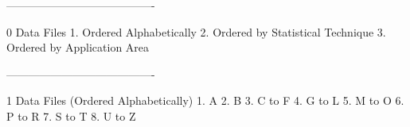  
 
 
 
 
 
 
 
 
 
 
 
 
 
 
 
 
 
 
 
 
 
 
 
 
 
 
 
 
 
 
 
 
 
 
 
 
 
 
 
 
 
 
 
 
 
 
 
 
 
 
 
 
 
 
 
 
 
 
 
 
 
 
 
 
 
 
 
 
 
 
 
 
 
 
 
 
 
 
 
 
 
 
 
 
 
 
 
 
 
 
 
 
 
 
 
 
 
 
 
 
 
----------------------------------------
 
0
Data Files
   1. Ordered Alphabetically
   2. Ordered by Statistical Technique
   3. Ordered by Application Area
 
----------------------------------------
 
1
Data Files (Ordered Alphabetically)
   1. A
   2. B
   3. C to F
   4. G to L
   5. M to O
   6. P to R
   7. S to T
   8. U to Z
 
